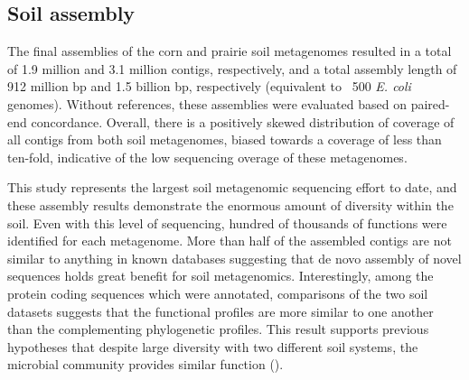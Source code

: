 \documentclass[11pt]{article} %
\begin{document}
\subsection{Soil assembly}
The final assemblies of the corn and prairie soil metagenomes resulted
in a total of 1.9 million and 3.1 million contigs, respectively, and a
total assembly length of 912 million bp and 1.5 billion bp,
respectively (equivalent to ~500 \emph{E. coli} genomes).  Without references, these
assemblies were evaluated based on paired-end concordance.  Overall,
there is a positively skewed distribution of coverage of all contigs
from both soil metagenomes, biased towards a coverage of less than
ten-fold, indicative of the low sequencing overage of these
metagenomes.


This study represents the largest soil metagenomic sequencing effort
to date, and these assembly results demonstrate the enormous amount of
diversity within the soil.  Even with this level of sequencing,
hundred of thousands of functions were identified for each metagenome.
More than half of the assembled contigs are not similar to anything in
known databases suggesting that de novo assembly of novel sequences
holds great benefit for soil metagenomics.  Interestingly, among the
protein coding sequences which were annotated, comparisons of the two
soil datasets suggests that the functional profiles are more similar
to one another than the complementing phylogenetic profiles.  This
result supports previous hypotheses that despite large diversity with
two different soil systems, the microbial community provides similar
function (\cite{Girvan:2005jv,McGradySteed:1997uj,Muller:2002cd,Konstantinidis:2004hr}).
\end{document}
